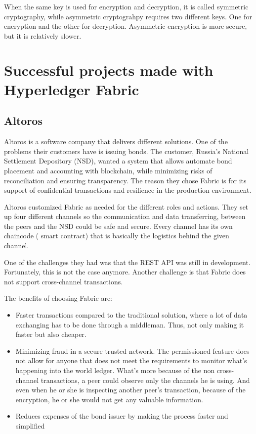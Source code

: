 \documentclass[a4paper,11pt]{report}
\begin{document}
When the same key is used for encryption and decryption, it is called symmetric cryptography, while asymmetric cryptograhpy requires two different keys. One for encryption and the other for decryption. Asymmetric encryption is more secure, but it is relatively slower. \cite{symasym}


\section{Successful projects made with Hyperledger Fabric}
\label{successfulFabric}

\subsection{Altoros}
\label{altoros}
Altoros is a software company that delivers different solutions. One of the problems their customers have is issuing bonds. The customer, Russia's National Settlement Depository (NSD), wanted a system that allows automate bond placement and accounting with blockchain, while minimizing risks of reconciliation and ensuring transparency. The reason they chose Fabric is for its support of confidential transactions and resilience in the production environment. \cite{altoros}

	Altoros customized Fabric as needed for the different roles and actions. They set up four different channels so the communication and data transferring, between the peers and the NSD could be safe and secure. Every channel has its own chaincode ( smart contract) that is basically the logistics behind the given channel.
	
	One of the challenges they had was that the REST API was still in development. Fortunately, this is not the case anymore. Another challenge is that Fabric does not support cross-channel transactions. \cite{altorosDemo}
	
The benefits of choosing Fabric are: 
\begin{itemize}
	
\item Faster transactions compared to the traditional solution, where a lot of data exchanging has to be done through a middleman. Thus, not only making it faster but also cheaper. 
\item Minimizing fraud in a secure trusted network. The permissioned feature does not allow for anyone that does not meet the requirements to monitor what’s happening into the world ledger. What’s more because of the non cross-channel transactions, a peer could observe only the channels he is using. And even when he or she is inspecting another peer’s transaction, because of the encryption, he or she would not get any valuable information. 
\item Reduces expenses of the bond issuer by making the process faster and simplified \cite{altorosDemo}
\end{itemize}
\end{document}
